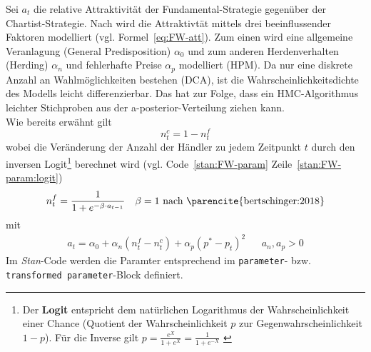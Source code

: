 \documentclass[ngerman]{ttlab-qualify}
\begin{document}
Sei $a_t$ die relative Attraktivität der Fundamental-Strategie gegenüber der Chartist-Strategie. Nach \parencite{bertschinger:2018, FW:2011} wird die Attraktivtät mittels drei beeinflussender Faktoren modelliert (vgl. Formel~\ref{eq:FW-att}). 
Zum einen wird eine allgemeine Veranlagung (General Predisposition) $\alpha_0$ und zum anderen Herdenverhalten (Herding) $\alpha_n$ und fehlerhafte Preise $\alpha_p$ modelliert (HPM).
Da nur eine diskrete Anzahl an Wahlmöglichkeiten bestehen (DCA), ist die Wahrscheinlichkeitsdichte des Modells leicht differenzierbar. Das hat zur Folge, dass ein HMC-Algorithmus leichter Stichproben aus der a-posterior-Verteilung ziehen kann.\\
Wie bereits erwähnt gilt \[n_t^c = 1-n_t^f\]
wobei die Veränderung der Anzahl der Händler zu jedem Zeitpunkt $t$ durch den inversen Logit\footnote{Der \textbf{Logit} entspricht dem natürlichen Logarithmus der Wahrscheinlichkeit einer Chance (Quotient der Wahrscheinlichkeit $p$ zur Gegenwahrscheinlichkeit $1-p$). Für die Inverse gilt $p=\frac{e^X}{1+e^X}=\frac{1}{1+e^{-X}}$ \parencite{logit}} berechnet wird (vgl. Code~\ref{stan:FW-param} Zeile~\ref{stan:FW-param:logit})
\begin{align}
\label{eq:FW-update}
n_t^f =\dfrac{1}{1+e^{-\beta\cdot a_{t-1}}} && \beta = 1\text{ nach \parencite{bertschinger:2018}}
\end{align}
mit
\begin{align}
\label{eq:FW-att}
a_t= \alpha_0+\alpha_n(n_t^f-n_t^c)+\alpha_p(p^*-p_t)^2 &&a_n, a_p >0
\end{align}
Im \textit{Stan}-Code werden die Paramter entsprechend im \verb|parameter|- bzw. \verb|transformed parameter|-Block definiert.
\end{document}

